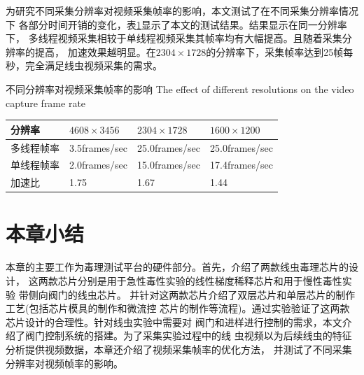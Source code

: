 	为研究不同采集分辨率对视频采集帧率的影响，本文测试了在不同采集分辨率情况下
	各部分时间开销的变化，表\ref{tab:resolutions}显示了本文的测试结果。结果显示在同一分辨率下，
	多线程视频采集相较于单线程视频采集其帧率均有大幅提高。且随着采集分辨率的提高，
	加速效果越明显。在$2304\times1728$的分辨率下，采集帧率达到25帧每秒，完全满足线虫视频采集的需求。
	\begin{table}[thbp]
	\centering
	\bicaption
    {不同分辨率对视频采集帧率的影响}
    {The effect of different resolutions on the video capture frame rate}
	\label{tab:resolutions}
	\begin{tabular}{p{80pt}p{80pt}p{80pt}p{80pt}}
	\toprule
	分辨率 & $4608\times3456$ & $2304\times1728$ & $1600\times1200$ \\
	\midrule
	多线程帧率 & 3.5frames/sec & 25.0frames/sec & 25.0frames/sec \\
	单线程帧率 & 2.0frames/sec  &15.0frames/sec &  17.4frames/sec \\
	加速比		&  1.75		  &   1.67        &  1.44 \\
	\bottomrule
	\end{tabular}
	\end{table}
\section{本章小结}
	本章的主要工作为毒理测试平台的硬件部分。首先，介绍了两款线虫毒理芯片的设计，
	这两款芯片分别是用于急性毒性实验的线性梯度稀释芯片和用于慢性毒性实验
	带侧向阀门的线虫芯片。
	并针对这两款芯片介绍了双层芯片和单层芯片的制作工艺(包括芯片模具的制作和微流控
	芯片的制作等流程)。通过实验验证了这两款芯片设计的合理性。针对线虫实验中需要对
	阀门和进样进行控制的需求，本文介绍了阀门控制系统的搭建。为了采集实验过程中的线
	虫视频以为后续线虫的特征分析提供视频数据，本章还介绍了视频采集帧率的优化方法，
	并测试了不同采集分辨率对视频帧率的影响。 